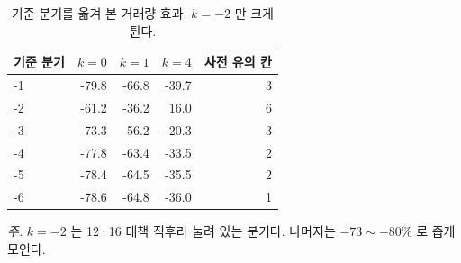 \begin{table}[htbp]
  \centering
  \caption{기준 분기를 옮겨 본 거래량 효과. $k=-2$ 만 크게 튄다.}
  \label{tab:pretrend-ref}
  \begin{tabular}{lrrrr}
    \toprule
    \textbf{기준 분기} & \textbf{$k{=}0$} & \textbf{$k{=}1$} & \textbf{$k{=}4$} & \textbf{사전 유의 칸} \\
    \midrule
    -1 & -79.8 & -66.8 & -39.7 & 3 \\
    -2 & -61.2 & -36.2 & 16.0 & 6 \\
    -3 & -73.3 & -56.2 & -20.3 & 3 \\
    -4 & -77.8 & -63.4 & -33.5 & 2 \\
    -5 & -78.4 & -64.5 & -35.5 & 2 \\
    -6 & -78.6 & -64.8 & -36.0 & 1 \\
    \bottomrule
  \end{tabular}

  \begin{minipage}{\linewidth}\footnotesize
  \textit{주.} $k=-2$ 는 12·16 대책 직후라 눌려 있는 분기다. 나머지는 $-73 \sim -80\%$ 로 좁게 모인다.
  \end{minipage}
\end{table}
